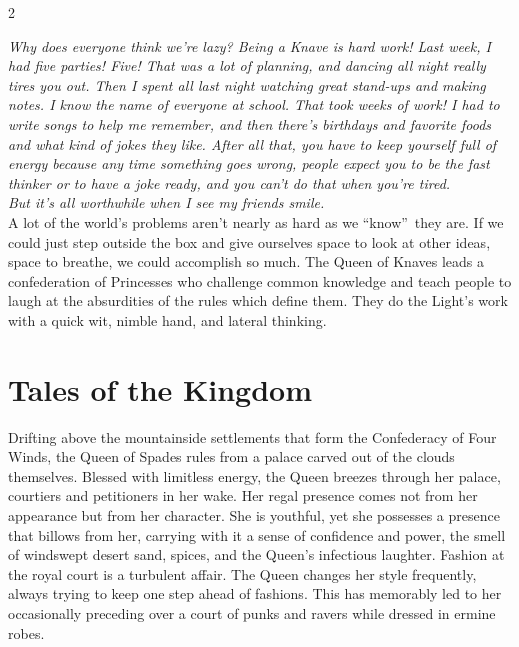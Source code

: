 \label{scha:Spades}\begin{multicols}{2}\raggedcolumns

\noindent \textit{Why does everyone think we're lazy? Being a Knave is hard work! Last week, I had five parties! Five! That was a lot of planning, and dancing all night really tires you out. Then I spent all last night watching great stand-ups and making notes. I know the name of everyone at school. That took weeks of work! I had to write songs to help me remember, and then there's birthdays and favorite foods and what kind of jokes they like. After all that, you have to keep yourself full of energy because any time something goes wrong, people expect you to be the fast thinker or to have a joke ready, and you can't do that when you're tired.}\\

\noindent \textit{But it's all worthwhile when I see my friends smile.}\\

\noindent A lot of the world's problems aren't nearly as hard as we \textquotedblleft know\textquotedblright\, they are. If we could just step outside the box and give ourselves space to look at other ideas, space to breathe, we could accomplish so much. The Queen of Knaves leads a confederation of Princesses who challenge common knowledge and teach people to laugh at the absurdities of the rules which define them. They do the Light's work with a quick wit, nimble hand, and lateral thinking. 

\section*{Tales of the Kingdom}

Drifting above the mountainside settlements that form the Confederacy of Four Winds, the Queen of Spades rules from a palace carved out of the clouds themselves. Blessed with limitless energy, the Queen breezes through her palace, courtiers and petitioners in her wake. Her regal presence comes not from her appearance but from her character. She is youthful, yet she possesses a presence that billows from her, carrying with it a sense of confidence and power, the smell of windswept desert sand, spices, and the Queen's infectious laughter. Fashion at the royal court is a turbulent affair. The Queen changes her style frequently, always trying to keep one step ahead of fashions. This has memorably led to her occasionally preceding over a court of punks and ravers while dressed in ermine robes.


\end{multicols}
